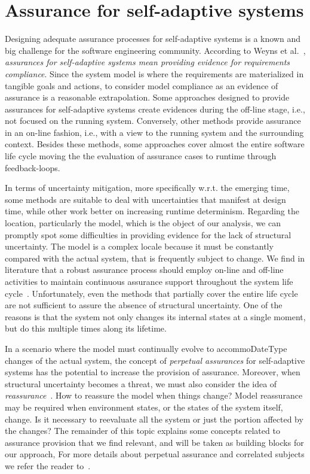 \section {Assurance for self-adaptive systems}

Designing adequate assurance processes for self-adaptive systems is a known and big challenge for the software engineering community. According to Weyns et al.~\cite{Weyns2016PerpetualAF}, \textit{assurances for self-adaptive systems mean providing evidence for requirements compliance}. Since the system model is where the requirements are materialized in tangible goals and actions, to consider model compliance as an evidence of assurance is a reasonable extrapolation. Some approaches designed to provide assurances for self-adaptive systems create evidences during the off-line stage, i.e., not focused on the running system. Conversely, other methods provide assurance in an on-line fashion, i.e., with a view to the running system and the surrounding context. Besides these methods, some approaches cover almost the entire software life cycle moving the the evaluation of assurance cases to runtime through feedback-loops.

In terms of uncertainty mitigation, more specifically w.r.t. the emerging time, some methods are suitable to deal with uncertainties that manifest at design time, while other work better on increasing runtime determinism. Regarding the location, particularly the model, which is the object of our analysis, we can promptly spot some difficulties in providing evidence for the lack of structural uncertainty. The model is a complex locale because it must be constantly compared with the actual system, that is frequently subject to change. We find in literature that a robust assurance process should employ on-line and off-line activities to maintain continuous assurance support throughout the system life cycle~\cite{LemosAss}. Unfortunately, even the methods that partially cover the entire life cycle are not sufficient to assure the absence of structural uncertainty. One of the reasons is that the system not only changes its internal states at a single moment, but do this multiple times along its lifetime. 

In a scenario where the model must continually evolve to accommoDateType changes of the actual system, the concept of \textit{perpetual assurances} for self-adaptive systems has the potential to increase the provision of assurance. Moreover, when structural uncertainty becomes a threat, we must also consider the idea of \textit{reassurance}~\cite{LemosAss}. How to reassure the model when things change? Model reassurance may be required when environment states, or the states of the system itself, change. Is it necessary to reevaluate all the system or just the portion affected by the changes? The remainder of this topic explains some concepts related to assurance provision that we find relevant, and will be taken as building blocks for our approach, For more details about perpetual assurance and correlated subjects we refer the reader to~\cite{Weyns2016PerpetualAF}.

